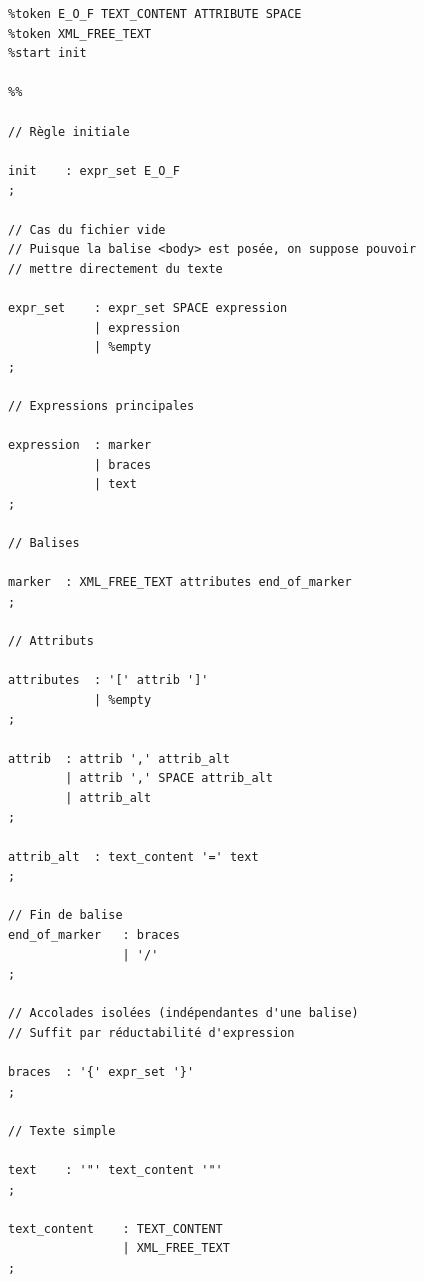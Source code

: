 \begin{verbatim}
%token E_O_F TEXT_CONTENT ATTRIBUTE SPACE
%token XML_FREE_TEXT
%start init

%%

// Règle initiale

init 	: expr_set E_O_F
;

// Cas du fichier vide
// Puisque la balise <body> est posée, on suppose pouvoir
// mettre directement du texte

expr_set 	: expr_set SPACE expression 
    		| expression 						
    		| %empty 						
;

// Expressions principales

expression 	: marker 								
		   	| braces 								
		   	| text 									
;

// Balises

marker 	: XML_FREE_TEXT attributes end_of_marker	
;

// Attributs

attributes 	: '[' attrib ']'					 	
	   		| %empty								
;

attrib 	: attrib ',' attrib_alt 					
		| attrib ',' SPACE attrib_alt 				
       	| attrib_alt								
;

attrib_alt	: text_content '=' text 				
;

// Fin de balise
end_of_marker 	: braces 							
	      		| '/'								
;

// Accolades isolées (indépendantes d'une balise)
// Suffit par réductabilité d'expression

braces 	: '{' expr_set '}'							
;

// Texte simple

text 	: '"' text_content '"'
;

text_content 	: TEXT_CONTENT 						
				| XML_FREE_TEXT						
;
\end{verbatim}